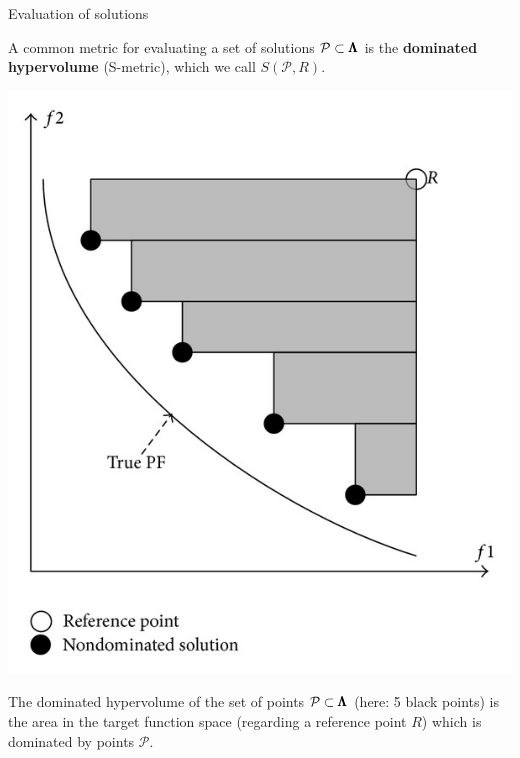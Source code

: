 \begin{frame}{Evaluation of solutions}

A common metric for evaluating a set of solutions $\mathcal{P} \subset \pmb{\Lambda}$ is the \textbf{dominated hypervolume} (S-metric), which we call $S(\mathcal{P}, R)$.

\vspace*{-0.4cm}

\begin{center}
\includegraphics[width = 0.3\linewidth]{images/dominated_hypervolume.png}
\end{center}

\vspace*{-0.4cm}

The dominated hypervolume of the set of points $\mathcal{P} \subset \pmb{\Lambda}$ (here: 5 black points) is the area in the target function space (regarding a reference point $R$) which is dominated by points $\mathcal{P}$.

\end{frame}


